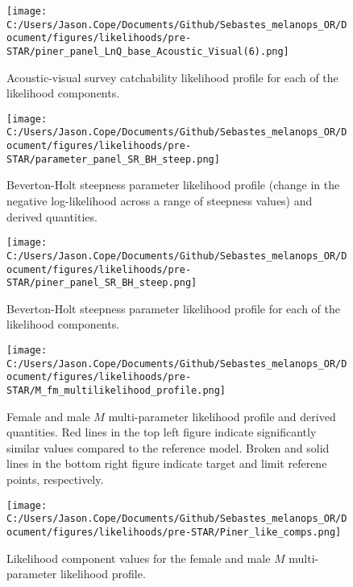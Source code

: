 \documentclass[11pt,
  english,
  letterpaper,
]{article}
\begin{document}
\newpage

\begin{figure}
\centering
\texttt{[image: C:/Users/Jason.Cope/Documents/Github/Sebastes\_melanops\_OR/Document/figures/likelihoods/pre-STAR/piner\_panel\_LnQ\_base\_Acoustic\_Visual(6).png]}
\caption{Acoustic-visual survey catchability likelihood profile for each of the likelihood components.\label{fig:AVq-profile-components}}
\end{figure}

\newpage

\begin{figure}
\centering
\texttt{[image: C:/Users/Jason.Cope/Documents/Github/Sebastes\_melanops\_OR/Document/figures/likelihoods/pre-STAR/parameter\_panel\_SR\_BH\_steep.png]}
\caption{Beverton-Holt steepness parameter likelihood profile (change in the negative log-likelihood across a range of steepness values) and derived quantities.\label{fig:steepness-profile}}
\end{figure}

\newpage

\begin{figure}
\centering
\texttt{[image: C:/Users/Jason.Cope/Documents/Github/Sebastes\_melanops\_OR/Document/figures/likelihoods/pre-STAR/piner\_panel\_SR\_BH\_steep.png]}
\caption{Beverton-Holt steepness parameter likelihood profile for each of the likelihood components.\label{fig:steepness-profile-components}}
\end{figure}

\newpage

\begin{figure}
\centering
\texttt{[image: C:/Users/Jason.Cope/Documents/Github/Sebastes\_melanops\_OR/Document/figures/likelihoods/pre-STAR/M\_fm\_multilikelihood\_profile.png]}
\caption{Female and male \(M\) multi-parameter likelihood profile and derived quantities. Red lines in the top left figure indicate significantly similar values compared to the reference model. Broken and solid lines in the bottom right figure indicate target and limit referene points, respectively.\label{fig:M-multiprofile-combo}}
\end{figure}

\newpage

\begin{figure}
\centering
\texttt{[image: C:/Users/Jason.Cope/Documents/Github/Sebastes\_melanops\_OR/Document/figures/likelihoods/pre-STAR/Piner\_like\_comps.png]}
\caption{Likelihood component values for the female and male \(M\) multi-parameter likelihood profile.\label{fig:M-multiprofile-like-components}}
\end{figure}
\end{document}
